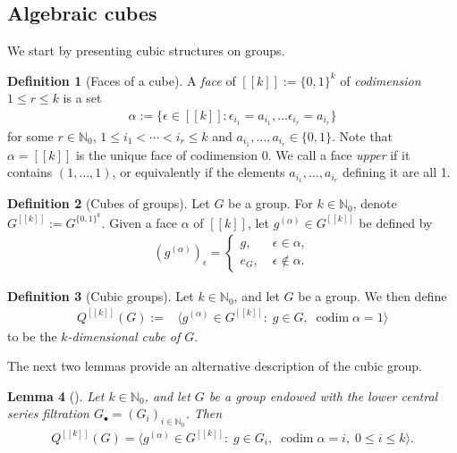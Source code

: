 \documentclass[11pt]{amsart}
\newtheorem{lemma}{Lemma}[section]
\theoremstyle{definition}
\newtheorem{definition}[lemma]{Definition}
\newcommand{\N}{{\mathbb N}}
\newcommand{\eps}{\epsilon}
\newcommand{\cube}[1]{{[\![#1]\!]}}
\newcommand{\1}{{\mathbf{1}}}
\DeclareMathOperator{\codim}{codim}
\begin{document}
\subsection{Algebraic cubes}
We start by presenting cubic structures on groups. 
\begin{definition}[Faces of a cube]
    A \textit{face} of $\cube{k}:=\{0,1\}^k$ of \textit{codimension} $1\leq r\leq k$ is a set
    \begin{align*}
        \alpha := \{\eps\in\cube{k}\colon \eps_{i_1} = a_{i_1}, \ldots \eps_{i_r}=a_{i_r}\}
    \end{align*}
    for some $r\in\N_0$, $1\leq i_1 < \cdots < i_r\leq k$ and $a_{i_1}, \ldots, a_{i_r}\in\{0,1\}$. Note that $\alpha=\cube{k}$ is the unique face of codimension 0. {We call a face \textit{upper} if it contains $(1,\ldots, 1)$, or equivalently if the elements $a_{i_1}, \ldots, a_{i_r}$ defining it are all 1.}
\end{definition}

\begin{definition}[Cubes of groups]
    Let $G$ be a group. For $k\in\N_0$, denote $G^{\cube{k}} := G^{\{0,1\}^k}$. Given a face $\alpha$ of $\cube{k}$, let $g^{(\alpha)} \in G^{\cube{k}}$ be defined by
    \begin{align*}
        (g^{(\alpha)})_\eps = \begin{cases}
            g,\; &\eps\in \alpha,\\
            e_G,\; &\eps\notin\alpha.
        \end{cases}
    \end{align*}
\end{definition}

\begin{definition}[Cubic groups]
    Let $k\in\N_0$, and let $G$ be a group. We then define
    \begin{align*}
        Q^\cube{k}(G) := &\langle g^{(\alpha)}\in G^\cube{k}\colon\; g\in G,\; \codim \alpha = 1\rangle
    \end{align*}
    to be the \textit{$k$-dimensional cube of $G$}.
\end{definition}
The next two lemmas provide an alternative description of the cubic group.
\begin{lemma}[{\cite[Chapter 6, Lemma~14]{HK18}}]\label{L: alternative cube description}
Let $k\in\N_0$, and let $G$ be a group endowed with the lower central series filtration $G_\bullet = (G_i)_{i\in\N_0}$. Then
    \begin{align*}
        Q^\cube{k}(G)=\langle g^{(\alpha)}\in G^\cube{k}\colon\; g\in G_{i},\; \codim \alpha = i,\; 0\leq i\leq k\rangle.
    \end{align*}
\end{lemma}
\end{document}
